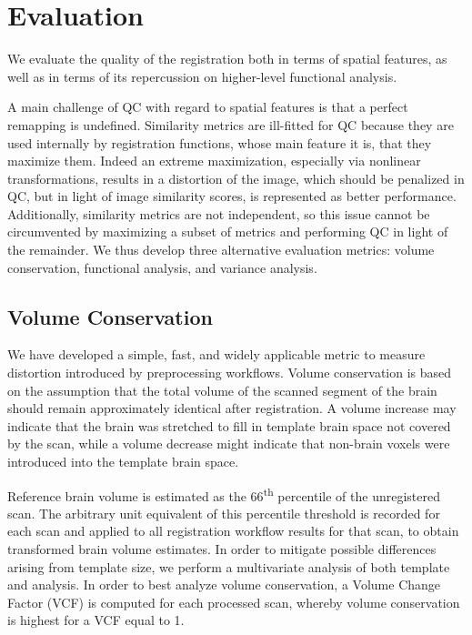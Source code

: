 \section{Evaluation}

We evaluate the quality of the registration both in terms of spatial features, as well as in terms of its repercussion on higher-level functional analysis.

A main challenge of QC with regard to spatial features is that a perfect remapping is undefined.
Similarity metrics are ill-fitted for QC because they are used internally by registration functions, whose main feature it is, that they maximize them.
Indeed an extreme maximization, especially via nonlinear transformations, results in a distortion of the image, which should be penalized in QC, but in light of image similarity scores, is represented as better performance.
Additionally, similarity metrics are not independent, so this issue cannot be circumvented by maximizing a subset of metrics and performing QC in light of the remainder.
We thus develop three alternative evaluation metrics: volume conservation, functional analysis, and variance analysis.

\subsection{Volume Conservation}

We have developed a simple, fast, and widely applicable metric to measure distortion introduced by preprocessing workflows.
Volume conservation is based on the assumption that the total volume of the scanned segment of the brain should remain approximately identical after registration.
A volume increase may indicate that the brain was stretched to fill in template brain space not covered by the scan, while a volume decrease might indicate that non-brain voxels were introduced into the template brain space.

Reference brain volume is estimated as the 66\textsuperscript{th} percentile of the unregistered scan.
The arbitrary unit equivalent of this percentile threshold is recorded for each scan and applied to all registration workflow results for that scan, to obtain transformed brain volume estimates.
In order to mitigate possible differences arising from template size, we perform a multivariate analysis of both template and analysis.
In order to best analyze volume conservation, a Volume Change Factor (VCF) is computed for each processed scan, whereby volume conservation is highest for a VCF equal to 1.

